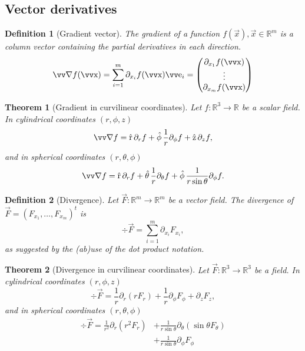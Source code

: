 \documentclass[margin=normal]{tex/hsrzf}
\theoremstyle{elmagzf}
\newtheorem{theorem}{Theorem}
\newtheorem{definition}{Definition}
\begin{document}
\subsection{Vector derivatives}

\begin{definition}[Gradient vector]
  The \emph{gradient} of a function \(f(\vec{x}), \vec{x}\in\mathbb{R}^m\) is a
  column vector containing the partial derivatives
  in each direction.
  \[
    \grad f (\vec{x}) = \sum_{i=1}^m \partial_{x_i} f(\vec{x}) \vec{e}_i
      = \begin{pmatrix}
        \partial_{x_1} f(\vec{x}) \\
        \vdots \\
        \partial_{x_m} f(\vec{x}) \\
      \end{pmatrix}
  \]
\end{definition}

\begin{theorem}[Gradient in curvilinear coordinates]
  Let \(f: \mathbb{R}^3 \to \mathbb{R}\) be a scalar field. In cylindrical
  coordinates \((r,\phi,z)\)
  \[
    \grad f = \uvec{r}\,\partial_r f 
      + \uvec{\phi}\,\frac{1}{r}\partial_\phi f
      + \uvec{z}\,\partial_z f,
  \]
  and in spherical coordinates \((r,\theta,\phi)\)
  \[
    \grad f = \uvec{r}\,\partial_r f
      + \uvec{\theta}\,\frac{1}{r} \partial_\theta f
      + \uvec{\phi}\,\frac{1}{r \sin\theta} \partial_\phi f.
  \]
\end{theorem}

\begin{definition}[Divergence]
  Let \(\vec{F}: \mathbb{R}^m \to \mathbb{R}^m\) be a vector field.
  The divergence of \(\vec{F} = (F_{x_1},\ldots, F_{x_m})^t\) is
  \[
    \div\vec{F} = \sum_{i = 1}^m \partial_{x_i} F_{x_i} ,
  \]
  as suggested by the (ab)use of the dot product notation.
\end{definition}

\begin{theorem}[Divergence in curvilinear coordinates]
  Let \(\vec{F}: \mathbb{R}^3 \to \mathbb{R}^3\) be a field. In cylindrical
  coordinates \((r,\phi,z)\)
  \[
    \div \vec{F} = \frac{1}{r} \partial_r (r F_r)
      + \frac{1}{r}\partial_\phi F_\phi
      + \partial_z F_z,
  \]
  and in spherical coordinates \((r,\theta,\phi)\)
  \begin{align*}
    \div \vec{F} = \frac{1}{r^2} \partial_r (r^2 F_r)
      & + \frac{1}{r \sin\theta} \partial_\theta (\sin\theta F_\theta) \\
      & + \frac{1}{r \sin\theta} \partial_\phi F_\phi
  \end{align*}
\end{theorem}
\end{document}
